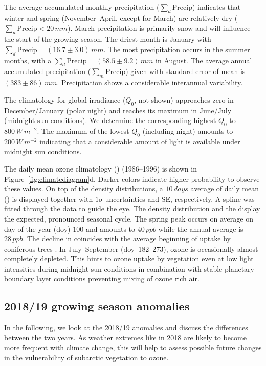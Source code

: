 \documentclass[bg, manuscript]{copernicus}
\begin{document}
The average accumulated monthly precipitation ($\sum_d\mathrm{Precip}$) indicates that winter and spring (November--April, except for March) are relatively dry ($\sum_d\mathrm{Precip} < 20\,\unit{mm}$). March precipitation is primarily snow and will influence the start of the growing season. The driest month is January with $\sum_d\mathrm{Precip} = (16.7\pm 3.0)\,\unit{mm}$. The most precipitation occurs in the summer months, with a $\sum_d\mathrm{Precip} = (58.5\pm 9.2)\,\unit{mm}$ in August. The average annual accumulated precipitation ($\sum_m\mathrm{Precip}$) given with standard error of mean is $(383\pm 86)\,\unit{mm}$. Precipitation shows a considerable interannual variability.

The climatology for global irradiance ($Q_0$, not shown) approaches zero in December/January (polar night) and reaches its maximum in June/July (midnight sun conditions). We determine the corresponding highest $Q_0$ to $800\,\unit{W\,m^{-2}}$. The maximum of the lowest $Q_0$ (including night) amounts to $200\,\unit{W\,m^{-2}}$ indicating that a considerable amount of light is available under midnight sun conditions.

The daily mean ozone climatology (\chem{\left<[O_3]\right>}) (1986--1996) is shown in Figure~\ref{fig:climatediagram}d. Darker colors indicate higher probability to observe these values. On top of the density distributions, a $10\,\unit{days}$ average of daily mean () is displayed together with $1 \sigma$ uncertainties and SE, respectively. A spline was fitted through the data to guide the eye. The \chem{[O_3]} density distribution and the  display the expected, pronounced seasonal cycle. The spring peak occurs on average on day of the year (\unit{doy}) $100$ and amounts to $40\,\unit{ppb}$ while the annual average \chem{\left<[O_3]\right>} is $28\,\unit{ppb}$. The decline in \chem{\left<[O_3]\right>} coincides with the average beginning of  uptake by coniferous trees \citep{TB:Kolari2007, TP:Wallin2013}. In July--September (\unit{doy}~182--273), ozone is occasionally almost completely depleted. This hints to ozone uptake by vegetation even at low light intensities during midnight sun conditions in combination with stable planetary boundary layer conditions preventing mixing of ozone rich air.

\subsection{2018/19 growing season anomalies}
\label{subsec:anomalies}
In the following, we look at the 2018/19 anomalies and discuss the differences between the two years. As weather extremes like in 2018 are likely to become more frequent with climate change, this will help to assess possible future changes in the vulnerability of subarctic vegetation to ozone.\\ 
\end{document}
